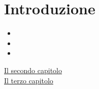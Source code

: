 \chapter{Introduzione}\label{ch:intro}

\lipsum[1]

\begin{itemize}
\item \lipsum[1][1]
\item \lipsum[1][2]
\item \lipsum[1][3]
\end{itemize}

\lipsum[2-3]\par\bigskip

\lipsum[1][1]
\begin{description}
\item[{\hyperref[ch:chap-name]{Il secondo capitolo}}] \lipsum[1][1-2]
\item[{\hyperref[ch:concl]{Il terzo capitolo}}] \lipsum[1][2-3]
\end{description}
